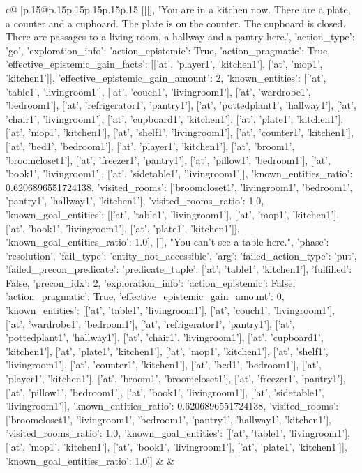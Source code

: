 \documentclass{article}
\begin{document}
{\begin{supertabular}{c@{$\;$}|p{.15\linewidth}@{}p{.15\linewidth}p{.15\linewidth}p{.15\linewidth}p{.15\linewidth}p{.15\linewidth}}
{{{	 [[[], 'You are in a kitchen now. There are a plate, a counter and a cupboard. The plate is on the counter. The cupboard is closed. There are passages to a living room, a hallway and a pantry here.', {'action_type': 'go', 'exploration_info': {'action_epistemic': True, 'action_pragmatic': True, 'effective_epistemic_gain_facts': [['at', 'player1', 'kitchen1'], ['at', 'mop1', 'kitchen1']], 'effective_epistemic_gain_amount': 2, 'known_entities': [['at', 'table1', 'livingroom1'], ['at', 'couch1', 'livingroom1'], ['at', 'wardrobe1', 'bedroom1'], ['at', 'refrigerator1', 'pantry1'], ['at', 'pottedplant1', 'hallway1'], ['at', 'chair1', 'livingroom1'], ['at', 'cupboard1', 'kitchen1'], ['at', 'plate1', 'kitchen1'], ['at', 'mop1', 'kitchen1'], ['at', 'shelf1', 'livingroom1'], ['at', 'counter1', 'kitchen1'], ['at', 'bed1', 'bedroom1'], ['at', 'player1', 'kitchen1'], ['at', 'broom1', 'broomcloset1'], ['at', 'freezer1', 'pantry1'], ['at', 'pillow1', 'bedroom1'], ['at', 'book1', 'livingroom1'], ['at', 'sidetable1', 'livingroom1']], 'known_entities_ratio': 0.6206896551724138, 'visited_rooms': ['broomcloset1', 'livingroom1', 'bedroom1', 'pantry1', 'hallway1', 'kitchen1'], 'visited_rooms_ratio': 1.0, 'known_goal_entities': [['at', 'table1', 'livingroom1'], ['at', 'mop1', 'kitchen1'], ['at', 'book1', 'livingroom1'], ['at', 'plate1', 'kitchen1']], 'known_goal_entities_ratio': 1.0}}], [[], "You can't see a table here.", {'phase': 'resolution', 'fail_type': 'entity_not_accessible', 'arg': {'failed_action_type': 'put', 'failed_precon_predicate': {'predicate_tuple': ['at', 'table1', 'kitchen1'], 'fulfilled': False, 'precon_idx': 2}}, 'exploration_info': {'action_epistemic': False, 'action_pragmatic': True, 'effective_epistemic_gain_amount': 0, 'known_entities': [['at', 'table1', 'livingroom1'], ['at', 'couch1', 'livingroom1'], ['at', 'wardrobe1', 'bedroom1'], ['at', 'refrigerator1', 'pantry1'], ['at', 'pottedplant1', 'hallway1'], ['at', 'chair1', 'livingroom1'], ['at', 'cupboard1', 'kitchen1'], ['at', 'plate1', 'kitchen1'], ['at', 'mop1', 'kitchen1'], ['at', 'shelf1', 'livingroom1'], ['at', 'counter1', 'kitchen1'], ['at', 'bed1', 'bedroom1'], ['at', 'player1', 'kitchen1'], ['at', 'broom1', 'broomcloset1'], ['at', 'freezer1', 'pantry1'], ['at', 'pillow1', 'bedroom1'], ['at', 'book1', 'livingroom1'], ['at', 'sidetable1', 'livingroom1']], 'known_entities_ratio': 0.6206896551724138, 'visited_rooms': ['broomcloset1', 'livingroom1', 'bedroom1', 'pantry1', 'hallway1', 'kitchen1'], 'visited_rooms_ratio': 1.0, 'known_goal_entities': [['at', 'table1', 'livingroom1'], ['at', 'mop1', 'kitchen1'], ['at', 'book1', 'livingroom1'], ['at', 'plate1', 'kitchen1']], 'known_goal_entities_ratio': 1.0}}]] 
	  } 
	   } 
	   } 
	 & & \\ 
 


\end{supertabular}}
\end{document}

